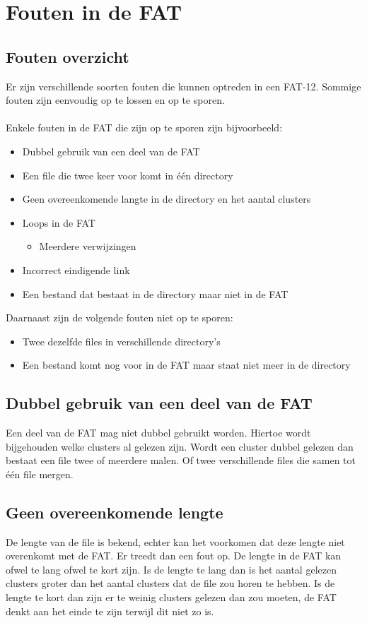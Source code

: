 \documentclass[11pt]{article}
\begin{document}
	\newpage
	\section{Fouten in de FAT}\label{sec:fout}
	\subsection{Fouten overzicht}\label{sec:overzicht}
	Er zijn verschillende soorten fouten die kunnen optreden in een FAT-12. Sommige fouten zijn eenvoudig op te lossen en op te sporen.\\\\
	Enkele fouten in de FAT die zijn op te sporen zijn bijvoorbeeld:
	\begin{itemize}
		\item Dubbel gebruik van een deel van de FAT
		\item Een file die twee keer voor komt in \'e\'en directory
		\item Geen overeenkomende langte in de directory en het aantal clusters
		\item Loops in de FAT
		\begin{itemize}
			\item Meerdere verwijzingen 
		\end{itemize}
		\item Incorrect eindigende link
		\item Een bestand dat bestaat in de directory maar niet in de FAT
	\end{itemize}
	Daarnaast zijn de volgende fouten niet op te sporen:
	\begin{itemize}
		\item Twee dezelfde files in verschillende directory's
		\item Een bestand komt nog voor in de FAT maar staat niet meer in de directory
	\end{itemize}

	\subsection{Dubbel gebruik van een deel van de FAT}\label{sec:dubbel}
	Een deel van de FAT mag niet dubbel gebruikt worden. Hiertoe wordt bijgehouden welke clusters al gelezen zijn. Wordt een cluster dubbel gelezen dan bestaat een file twee of meerdere malen. Of twee verschillende files die samen tot \'e\'en file mergen.

	\subsection{Geen overeenkomende lengte}\label{sec:lengte}
	De lengte van de file is bekend, echter kan het voorkomen dat deze lengte niet overenkomt met de FAT. Er treedt dan een fout op. De lengte in de FAT kan ofwel te lang ofwel te kort zijn. Is de lengte te lang dan is het aantal gelezen clusters groter dan het aantal clusters dat de file zou horen te hebben. Is de lengte te kort dan zijn er te weinig clusters gelezen dan zou moeten, de FAT denkt aan het einde te zijn terwijl dit niet zo is.
\end{document}
